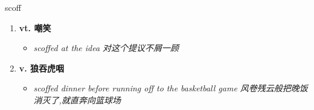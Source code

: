 
\begin{frame}
{\huge scoff}
\begin{center}
\begin{enumerate}\Large
  \item \textbf{vt. 嘲笑}
  \begin{itemize}
    \item \em{\Large{scoffed at the idea 对这个提议不屑一顾}}
  \end{itemize}
  \item \textbf{v. 狼吞虎咽}
  \begin{itemize}
    \item \em{\Large{scoffed dinner before running off to the basketball game 风卷残云般把晚饭消灭了,就直奔向篮球场}}
  \end{itemize}
\end{enumerate}
\end{center}
\end{frame}
